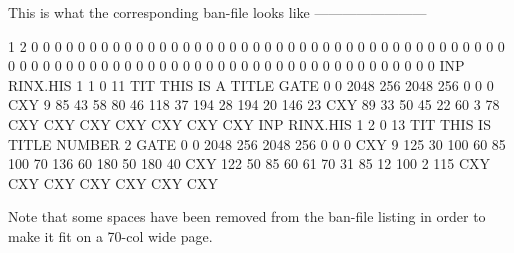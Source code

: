    This is what the corresponding ban-file looks like ------------------------
 
      1   2   0   0   0   0   0   0   0   0   0   0   0   0   0   0
      0   0   0   0   0   0   0   0   0   0   0   0   0   0   0   0
      0   0   0   0   0   0   0   0   0   0   0   0   0   0   0   0
      0   0   0   0   0   0   0   0   0   0   0   0   0   0   0   0
      0   0   0   0   0   0   0   0   0   0   0   0   0   0   0   0
   INP RINX.HIS                                  1   1   0  11
   TIT THIS IS A TITLE
   GATE  0   0    2048     256    2048     256   0   0   0
   CXY   9  85  43  58  80  46 118  37 194  28 194  20 146  23
   CXY  89  33  50  45  22  60   3  78
   CXY
   CXY
   CXY
   CXY
   CXY
   CXY
   CXY
   INP RINX.HIS                                  1   2   0  13
   TIT THIS IS TITLE NUMBER 2
   GATE  0   0    2048     256    2048     256   0   0   0
   CXY   9 125  30 100  60  85 100  70 136  60 180  50 180  40
   CXY 122  50  85  60  61  70  31  85  12 100   2 115
   CXY
   CXY
   CXY
   CXY
   CXY
   CXY
   CXY
 
   Note  that some spaces have been removed from the ban-file listing in order
   to make it fit on a 70-col wide page.
